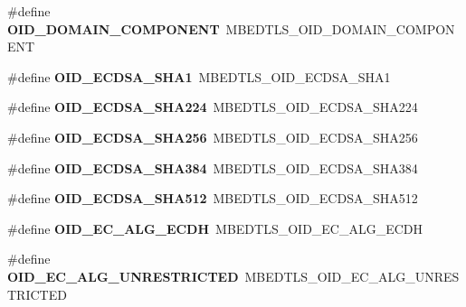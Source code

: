 \begin{DoxyCompactItemize}
\#define {\bfseries O\+I\+D\+\_\+\+D\+O\+M\+A\+I\+N\+\_\+\+C\+O\+M\+P\+O\+N\+E\+NT}~M\+B\+E\+D\+T\+L\+S\+\_\+\+O\+I\+D\+\_\+\+D\+O\+M\+A\+I\+N\+\_\+\+C\+O\+M\+P\+O\+N\+E\+NT
\item 
\mbox{\label{compat-1_83_8h_a10978a47054b2195610dd78e9c53456b}} 
\#define {\bfseries O\+I\+D\+\_\+\+E\+C\+D\+S\+A\+\_\+\+S\+H\+A1}~M\+B\+E\+D\+T\+L\+S\+\_\+\+O\+I\+D\+\_\+\+E\+C\+D\+S\+A\+\_\+\+S\+H\+A1
\item 
\mbox{\label{compat-1_83_8h_a8736f5772bb26c34b330f843125c7a4e}} 
\#define {\bfseries O\+I\+D\+\_\+\+E\+C\+D\+S\+A\+\_\+\+S\+H\+A224}~M\+B\+E\+D\+T\+L\+S\+\_\+\+O\+I\+D\+\_\+\+E\+C\+D\+S\+A\+\_\+\+S\+H\+A224
\item 
\mbox{\label{compat-1_83_8h_a4dd31591f3c1c6d6e713fb0d282a632a}} 
\#define {\bfseries O\+I\+D\+\_\+\+E\+C\+D\+S\+A\+\_\+\+S\+H\+A256}~M\+B\+E\+D\+T\+L\+S\+\_\+\+O\+I\+D\+\_\+\+E\+C\+D\+S\+A\+\_\+\+S\+H\+A256
\item 
\mbox{\label{compat-1_83_8h_ae1e3cf7185bd331021e9f083dff9d5b0}} 
\#define {\bfseries O\+I\+D\+\_\+\+E\+C\+D\+S\+A\+\_\+\+S\+H\+A384}~M\+B\+E\+D\+T\+L\+S\+\_\+\+O\+I\+D\+\_\+\+E\+C\+D\+S\+A\+\_\+\+S\+H\+A384
\item 
\mbox{\label{compat-1_83_8h_a5e90856601283b52383de08aea953e9e}} 
\#define {\bfseries O\+I\+D\+\_\+\+E\+C\+D\+S\+A\+\_\+\+S\+H\+A512}~M\+B\+E\+D\+T\+L\+S\+\_\+\+O\+I\+D\+\_\+\+E\+C\+D\+S\+A\+\_\+\+S\+H\+A512
\item 
\mbox{\label{compat-1_83_8h_a3b9185bd074afe20f501616b12e00b7f}} 
\#define {\bfseries O\+I\+D\+\_\+\+E\+C\+\_\+\+A\+L\+G\+\_\+\+E\+C\+DH}~M\+B\+E\+D\+T\+L\+S\+\_\+\+O\+I\+D\+\_\+\+E\+C\+\_\+\+A\+L\+G\+\_\+\+E\+C\+DH
\item 
\mbox{\label{compat-1_83_8h_a6115477e9e9f7bae09e7a83224165c73}} 
\#define {\bfseries O\+I\+D\+\_\+\+E\+C\+\_\+\+A\+L\+G\+\_\+\+U\+N\+R\+E\+S\+T\+R\+I\+C\+T\+ED}~M\+B\+E\+D\+T\+L\+S\+\_\+\+O\+I\+D\+\_\+\+E\+C\+\_\+\+A\+L\+G\+\_\+\+U\+N\+R\+E\+S\+T\+R\+I\+C\+T\+ED
\item 
\mbox{\label{compat-1_83_8h_a4be32a44be62a8fd730fb7c5a01d7fc2}} 

\end{DoxyCompactItemize}
